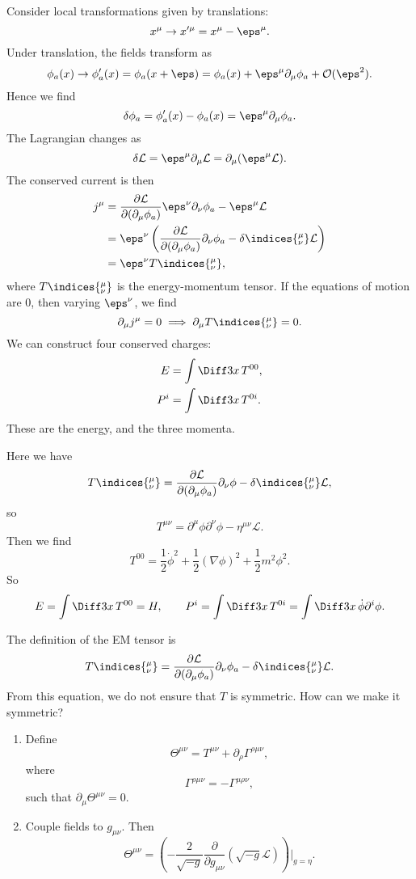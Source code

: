 \documentclass[12pt]{article}
\begin{document}
Consider local transformations given by translations:
\[
x^\mu \to x'^\mu = x^\mu - \eps^\mu.
\]
Under translation, the fields transform as
\[
\phi_a(x) \to \phi_a'(x) = \phi_a(x + \eps) = \phi_a(x) + \eps^\mu \partial_\mu \phi_a + \mathcal{O}(\eps^2).
\]
Hence we find
\[
\delta \phi_a = \phi_a'(x) - \phi_a(x) = \eps^\mu \partial_\mu \phi_a.
\]
The Lagrangian changes as
\[
\delta \mathcal{L} = \eps^\mu \partial_\mu \mathcal{L} = \partial_\mu (\eps^\mu \mathcal{L}).
\]
The conserved current is then
\begin{align*}
	j^\mu &= \frac{\partial \mathcal{L}}{\partial(\partial_\mu \phi_a)} \eps^\nu \partial_\nu \phi_a - \eps^\mu \mathcal{L} \\
	      &= \eps^\nu \left( \frac{\partial \mathcal{L}}{\partial (\partial_\mu \phi_a)} \partial_\nu \phi_a - \delta\indices{^{\mu}_{\nu}} \mathcal{L} \right) \\
	      &= \eps^\nu T\indices{^{\mu}_{\nu}},
\end{align*}
where $T\indices{^{\mu}_{\nu}}$ is the energy-momentum tensor. If the equations of motion are 0, then varying $\eps^\nu$, we find
\[
\partial_\mu j^\mu = 0 \implies \partial_\mu T\indices{^{\mu}_{\nu}} = 0.
\]
We can construct four conserved charges:
\begin{align*}
	E &= \int \Diff3 x \, T^{00}, \\
	P^i &= \int \Diff 3 x \, T^{0i}.
\end{align*}
These are the energy, and the three momenta.

\begin{exbox}
	Here we have
	\[
	T\indices{^{\mu}_{\nu}} = \frac{\partial \mathcal{L}}{\partial (\partial_\mu \phi_a)} \partial_\nu \phi - \delta\indices{^{\mu}_{\nu}} \mathcal{L},
	\]
	so
	\[
	T^{\mu\nu}= \partial^\mu \phi \partial^\nu \phi - \eta^{\mu\nu} \mathcal{L}.
	\]
	Then we find
	\[
	T^{00} = \frac{1}{2} \dot \phi^2 + \frac{1}{2} (\nabla \phi)^2 + \frac{1}{2} m^2 \phi^2.
	\]
	So
	\[
	E = \int \Diff 3 x \, T^{00} = H, \qquad P^i = \int \Diff 3 x \, T^{0i} = \int \Diff 3x \, \dot \phi \partial^i \phi.
	\]
\end{exbox}

\begin{remark}
	The definition of the EM tensor is
	\[
	T\indices{^{\mu}_{\nu}} = \frac{\partial \mathcal{L}}{\partial (\partial_\mu \phi_a)} \partial_\nu \phi_a - \delta\indices{^{\mu}_{\nu}} \mathcal{L}.
	\]
	From this equation, we do not ensure that $T$ is symmetric. How can we make it symmetric?
	\begin{enumerate}
		\item Define
			\[
			\Theta^{\mu\nu} = T^{\mu\nu} + \partial_\rho \Gamma^{\rho\mu\nu},
			\]
			where
			\[
			\Gamma^{\rho\mu\nu}= - \Gamma^{\mu\rho\nu},
			\]
			such that $\partial_\mu \Theta^{\mu\nu} = 0$.
		\item Couple fields to $g_{\mu\nu}$. Then
			\[
			\Theta^{\mu\nu} = \left( - \frac{2}{\sqrt{-g}} \frac{\partial}{\partial g_{\mu\nu}} \left( \sqrt{-g} \mathcal{L} \right) \right) \biggr|_{g = \eta}.
			\]
	\end{enumerate}
	
\end{remark}
\end{document}
